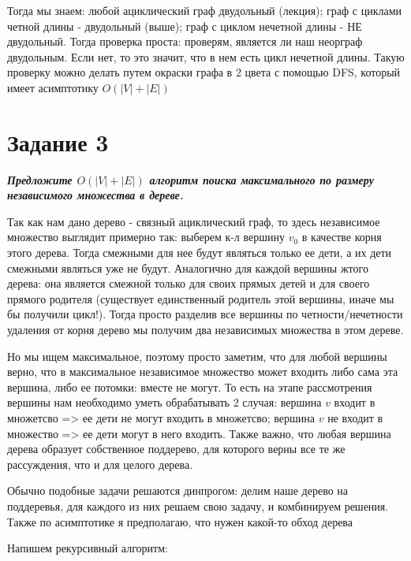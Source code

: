 \documentclass{article}
\begin{document}
Тогда мы знаем: любой ациклический граф двудольный (лекция); граф с циклами четной длины - двудольный (выше); граф с циклом нечетной длины - НЕ двудольный. Тогда проверка проста: проверям, является ли наш неорграф двудольным. Если нет, то это значит, что в нем есть цикл нечетной длины. Такую проверку можно делать путем окраски графа в 2 цвета с помощью DFS, который имеет асимптотику $O(|V| + |E|)$

\bigskip


\section*{\textbf{Задание 3}} \textbf{\textit{Предложите $O(|V| + |E|)$ алгоритм поиска максимального по размеру независимого множества в дереве.}}

Так как нам дано дерево - связный ациклический граф, то здесь независимое множество выглядит примерно так: выберем к-л вершину $v_0$ в качестве корня этого дерева. 
Тогда смежными для нее будут являться только ее дети, а их дети смежными являться уже не будут. Аналогично для каждой вершины жтого дерева: она является смежной только для своих прямых детей и для своего прямого родителя (существует единственный родитель этой вершины, иначе мы бы получили цикл!). Тогда просто разделив все вершины по четности/нечетности удаления от корня дерево мы получим два независимых множества в этом дереве.

Но мы ищем максимальное, поэтому просто заметим, что для любой вершины верно, что в максимальное независимое множество может входить либо сама эта вершина, либо ее потомки: вместе не могут. То есть на этапе рассмотрения вершины нам необходимо уметь обрабатывать 2 случая: вершина $v$ входит в множетсво => ее дети не могут входить в множетсво; вершина $v$ не входит в множество => ее дети могут в него входить. Также важно, что любая вершина дерева образует собственное поддерево, для которого верны все те же рассуждения, что и для целого дерева.

Обычно подобные задачи решаются динпрогом: делим наше дерево на поддеревья, для каждого из них решаем свою задачу, и комбинируем решения. Также по асимптотике я предполагаю, что нужен какой-то обход дерева

Напишем рекурсивный алгоритм:
\end{document}
